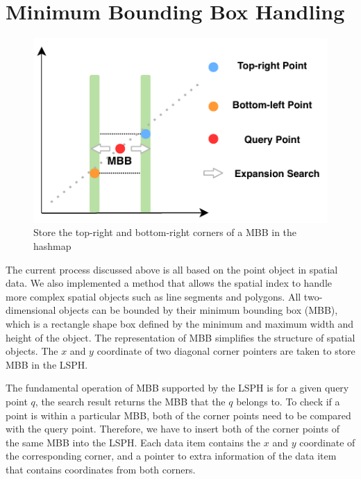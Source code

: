 \section{Minimum Bounding Box Handling}

\begin{figure}[ht]
\centering
\includegraphics{Figures/object.pdf}
\caption{Store the top-right and bottom-right corners of a MBB in the hashmap}
\label{fig:object}
\end{figure}

The current process discussed above is all based on the point object in spatial data. We also implemented a method that allows the spatial index to handle more complex spatial objects such as line segments and polygons. All two-dimensional objects can be bounded by their minimum bounding box (MBB), which is a rectangle shape box defined by the minimum and maximum width and height of the object. The representation of MBB simplifies the structure of spatial objects. The $x$ and $y$ coordinate of two diagonal corner pointers are taken to store MBB in the LSPH.  

The fundamental operation of MBB supported by the LSPH is for a given query point $q$, the search result returns the MBB that the $q$ belongs to. To check if a point is within a particular MBB, both of the corner points need to be compared with the query point. Therefore, we have to insert both of the corner points of the same MBB into the LSPH. Each data item contains the $x$ and $y$ coordinate of the corresponding corner, and a pointer to extra information of the data item that contains coordinates from both corners. 

